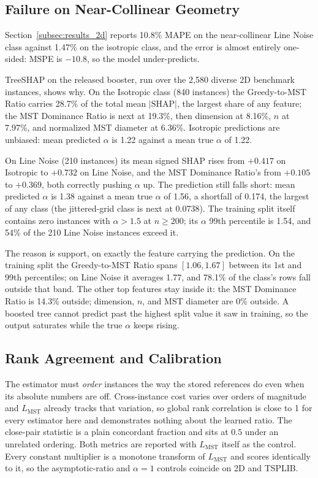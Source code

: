 \documentclass{article}
\begin{document}
\subsection{Failure on Near-Collinear Geometry} \label{subsec:coverage}

Section~\ref{subsec:results_2d} reports 10.8\% MAPE on the near-collinear Line Noise class against 1.47\% on the isotropic class, and the error is almost entirely one-sided: MSPE is $-10.8$, so the model under-predicts.

TreeSHAP on the released booster, run over the 2{,}580 diverse 2D benchmark instances, shows why. On the Isotropic class (840 instances) the Greedy-to-MST Ratio carries 28.7\% of the total mean $|\mathrm{SHAP}|$, the largest share of any feature; the MST Dominance Ratio is next at 19.3\%, then dimension at 8.16\%, $n$ at 7.97\%, and normalized MST diameter at 6.36\%. Isotropic predictions are unbiased: mean predicted $\alpha$ is 1.22 against a mean true $\alpha$ of 1.22.

On Line Noise (210 instances) its mean signed SHAP rises from $+0.417$ on Isotropic to $+0.732$ on Line Noise, and the MST Dominance Ratio's from $+0.105$ to $+0.369$, both correctly pushing $\alpha$ up. The prediction still falls short: mean predicted $\alpha$ is 1.38 against a mean true $\alpha$ of 1.56, a shortfall of 0.174, the largest of any class (the jittered-grid class is next at 0.0738). The training split itself contains zero instances with $\alpha>1.5$ at $n\ge200$; its $\alpha$ 99th percentile is 1.54, and 54\% of the 210 Line Noise instances exceed it.

The reason is support, on exactly the feature carrying the prediction. On the training split the Greedy-to-MST Ratio spans $[1.06,1.67]$ between its 1st and 99th percentiles; on Line Noise it averages 1.77, and 78.1\% of the class's rows fall outside that band. The other top features stay inside it: the MST Dominance Ratio is 14.3\% outside; dimension, $n$, and MST diameter are 0\% outside. A boosted tree cannot predict past the highest split value it saw in training, so the output saturates while the true $\alpha$ keeps rising.

\subsection{Rank Agreement and Calibration} \label{subsec:discussion}

The estimator must \emph{order} instances the way the stored references do even when its absolute numbers are off. Cross-instance cost varies over orders of magnitude and $L_{\mathrm{MST}}$ already tracks that variation, so global rank correlation is close to 1 for every estimator here and demonstrates nothing about the learned ratio. The close-pair statistic is a plain concordant fraction and sits at $0.5$ under an unrelated ordering. Both metrics are reported with $L_{\mathrm{MST}}$ itself as the control. Every constant multiplier is a monotone transform of $L_{\mathrm{MST}}$ and scores identically to it, so the asymptotic-ratio and $\alpha=1$ controls coincide on 2D and TSPLIB.
\end{document}
